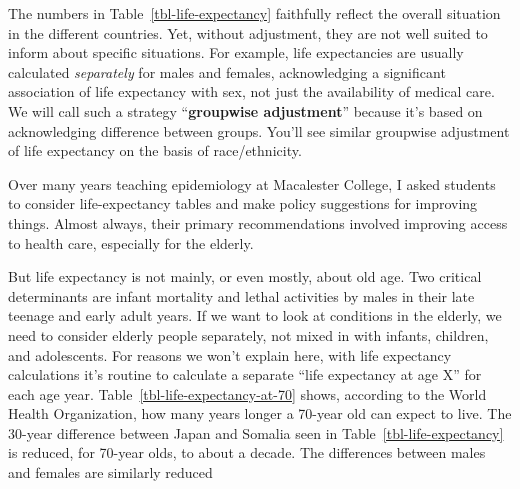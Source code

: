 \documentclass[
  letterpaper,
  DIV=11,
  numbers=noendperiod,
  oneside]{scrartcl}
\begin{document}

The numbers in Table~\ref{tbl-life-expectancy} faithfully reflect the
overall situation in the different countries. Yet, without adjustment,
they are not well suited to inform about specific situations. For
example, life expectancies are usually calculated \emph{separately} for
males and females, acknowledging a significant association of life
expectancy with sex, not just the availability of medical care. We will
call such a strategy ``\textbf{groupwise adjustment}'' because it's
based on acknowledging difference between groups. You'll see similar
groupwise adjustment of life expectancy on the basis of race/ethnicity.

Over many years teaching epidemiology at Macalester College, I asked
students to consider life-expectancy tables and make policy suggestions
for improving things. Almost always, their primary recommendations
involved improving access to health care, especially for the elderly.

But life expectancy is not mainly, or even mostly, about old age. Two
critical determinants are infant mortality and lethal activities by
males in their late teenage and early adult years. If we want to look at
conditions in the elderly, we need to consider elderly people
separately, not mixed in with infants, children, and adolescents. For
reasons we won't explain here, with life expectancy calculations it's
routine to calculate a separate ``life expectancy at age X'' for each
age year. Table~\ref{tbl-life-expectancy-at-70} shows, according to the
World Health Organization, how many years longer a 70-year old can
expect to live. The 30-year difference between Japan and Somalia seen in
Table~\ref{tbl-life-expectancy} is reduced, for 70-year olds, to about a
decade. The differences between males and females are similarly reduced
\end{document}
